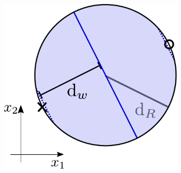 \begin{frame}
{\begin{figure}[h]
\begin{subfigure}[t]{0.22\textwidth}
{         \includegraphics[width=0.99\textwidth]{img/dvc_margin_max}
         }
     \end{subfigure}
	 \label{fig:shatter3pts}
\end{figure}
}
     
            
            
\end{frame}

